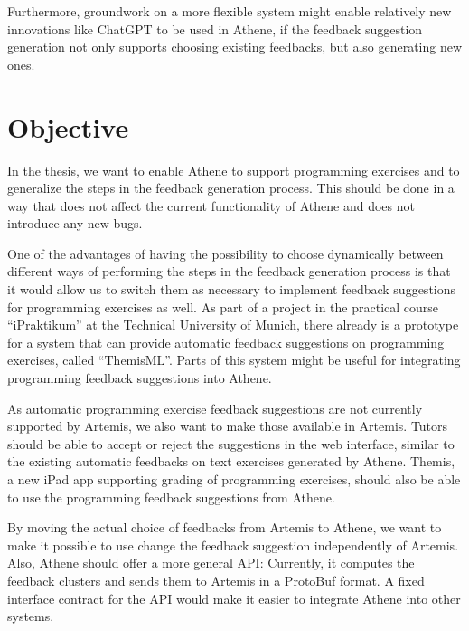 Furthermore, groundwork on a more flexible system might enable relatively new innovations like ChatGPT to be used in Athene, if the feedback suggestion generation not only supports choosing existing feedbacks, but also generating new ones.

\section*{Objective}
In the thesis, we want to enable Athene to support programming exercises and to generalize the steps in the feedback generation process. This should be done in a way that does not affect the current functionality of Athene and does not introduce any new bugs.

One of the advantages of having the possibility to choose dynamically between different ways of performing the steps in the feedback generation process is that it would allow us to switch them as necessary to implement feedback suggestions for programming exercises as well. As part of a project in the practical course \enquote{iPraktikum} at the Technical University of Munich, there already is a prototype for a system that can provide automatic feedback suggestions on programming exercises, called \enquote{ThemisML}. Parts of this system might be useful for integrating programming feedback suggestions into Athene.

As automatic programming exercise feedback suggestions are not currently supported by Artemis, we also want to make those available in Artemis. Tutors should be able to accept or reject the suggestions in the web interface, similar to the existing automatic feedbacks on text exercises generated by Athene. Themis, a new iPad app supporting grading of programming exercises, should also be able to use the programming feedback suggestions from Athene.

By moving the actual choice of feedbacks from Artemis to Athene, we want to make it possible to use change the feedback suggestion independently of Artemis. Also, Athene should offer a more general API: Currently, it computes the feedback clusters and sends them to Artemis in a ProtoBuf format. A fixed interface contract for the API would make it easier to integrate Athene into other systems.


